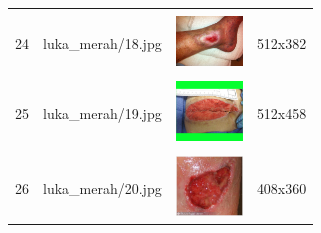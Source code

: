 \begin{table}[H]
\begin{tabular}{|m{0.2in}|m{1.2in}|m{0.7in}|m{0.7in}|}
		& &  &  \\
		24& 
		luka\_merah/18.jpg &
		\includegraphics[width=0.7in]{gambar/dataset_citra/luka_merah/bahan/18.jpg}&
		512x382\\
		\hline
		
		& &  &  \\
		25& 
		luka\_merah/19.jpg &
		\includegraphics[width=0.7in]{gambar/dataset_citra/luka_merah/bahan/19.jpg}&
		512x458\\
		\hline
		
		& &  &  \\
		26& 
		luka\_merah/20.jpg &
		\includegraphics[width=0.7in]{gambar/dataset_citra/luka_merah/bahan/20.jpg}&
		408x360\\
		\hline

	\end{tabular}
\end{table}

